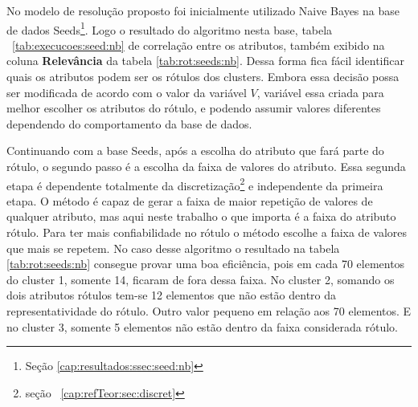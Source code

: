 No modelo de resolução proposto foi inicialmente utilizado Naive Bayes na base de dados Seeds\footnote{Seção \ref{cap:resultados:ssec:seed:nb}}. Logo o resultado do algoritmo nesta base, tabela ~\ref{tab:execucoes:seed:nb} de correlação entre os atributos, também exibido na coluna \textbf{Relevância} da tabela \ref{tab:rot:seeds:nb}. Dessa forma fica fácil identificar quais os atributos podem ser os rótulos dos clusters. Embora essa decisão possa ser modificada de acordo com o valor da variável ${V}$, variável essa criada para melhor escolher os atributos do rótulo, e podendo assumir valores diferentes dependendo do comportamento da base de dados.

Continuando com a base Seeds, após a escolha do atributo que fará parte do rótulo, o segundo passo é a escolha da faixa de valores do atributo. Essa segunda etapa é dependente totalmente da discretização\footnote{seção ~\ref{cap:refTeor:sec:discret}} e independente da primeira etapa. O método é capaz de gerar a faixa de maior repetição de valores de qualquer atributo, mas aqui neste trabalho o que importa é a faixa do atributo rótulo. Para ter mais  confiabilidade  no rótulo o método escolhe a faixa de valores que mais se repetem. No caso desse algoritmo o resultado na tabela \ref{tab:rot:seeds:nb} consegue provar uma boa eficiência, pois em cada 70 elementos do cluster 1, somente 14, ficaram de fora dessa faixa. No cluster 2, somando os dois atributos rótulos tem-se 12 elementos que não estão dentro da representatividade do rótulo. Outro valor pequeno em relação aos 70 elementos. E no cluster 3, somente 5 elementos não estão dentro da faixa considerada rótulo.


